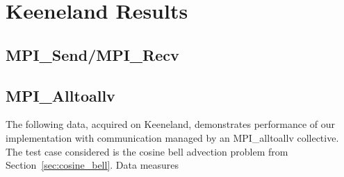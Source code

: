 
\chapter{Keeneland Results}


\section{MPI\_Send/MPI\_Recv}

\section{MPI\_Alltoallv}

The following data, acquired on Keeneland, demonstrates performance of our implementation with communication managed by an MPI\_alltoallv collective. The test case considered is the cosine bell advection problem from Section~\ref{sec:cosine_bell}. Data measures  

